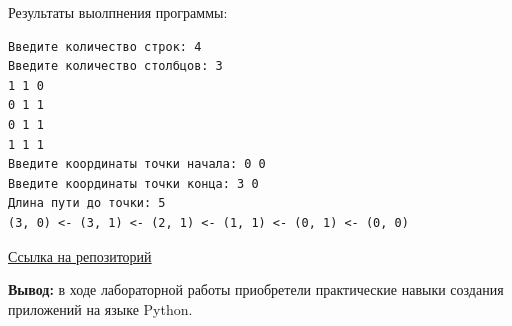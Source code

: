\documentclass[a4paper,14pt]{extarticle}
\begin{document}
Результаты выолпнения программы:
\begin{verbatim}
Введите количество строк: 4
Введите количество столбцов: 3
1 1 0
0 1 1
0 1 1
1 1 1
Введите координаты точки начала: 0 0
Введите координаты точки конца: 3 0
Длина пути до точки: 5
(3, 0) <- (3, 1) <- (2, 1) <- (1, 1) <- (0, 1) <- (0, 0)
\end{verbatim}

\href{https://gitlab.com/vlad4052/2024_pv223_vladislav_10}{Ссылка на репозиторий}

\textbf{Вывод: } в ходе лабораторной работы приобретели практические навыки создания приложений на
языке Python.
\end{document}
